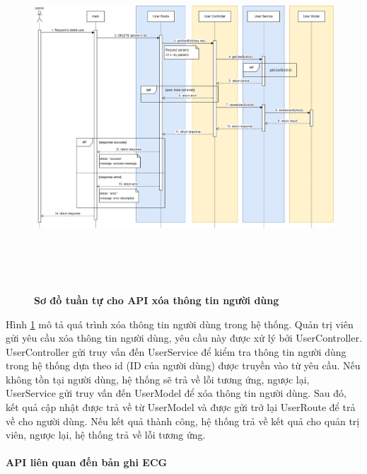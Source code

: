 \begin{figure}[H]
  \centering
  \includegraphics[width=16cm,height=13cm]{Images/sequence_api/deleteUserById.png}
  \caption[Sơ đồ tuần tự cho API xóa thông tin người dùng ]{\bfseries \fontsize{12pt}{0pt}
  \selectfont Sơ đồ tuần tự cho API xóa thông tin người dùng }
  \label{api_deleteUser} %
\end{figure}
Hình \ref{api_deleteUser} mô tả quá trình xóa thông tin người dùng trong hệ thống. Quản trị viên gửi yêu cầu xóa thông tin người dùng, 
yêu cầu này được xử lý bởi UserController. UserController gửi truy vấn đến UserService để kiểm tra thông tin người dùng trong hệ thống dựa theo id (ID của người dùng) được truyền vào từ yêu cầu. 
Nếu không tồn tại người dùng, hệ thống sẽ trả về lỗi tương ứng, ngược lại, UserService gửi truy vấn đến UserModel để xóa thông tin người dùng. Sau đó, kết quả cập nhật được trả về 
từ UserModel và được gửi trở lại UserRoute để trả về cho người dùng. Nếu kết quả thành công, hệ thống trả về kết quả cho quản trị viên, ngược lại, hệ thống trả về lỗi tương ứng.



\paragraph{API liên quan đến bản ghi ECG}
\mbox{}

